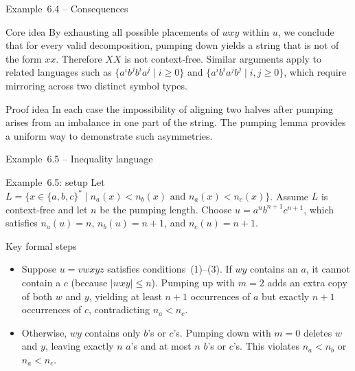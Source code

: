 \begin{frame}[t]{Example 6.4 – Consequences}
  \begin{tblock}{Core idea}
    By exhausting all possible placements of $w x y$ within $u$, we
    conclude that for every valid decomposition, pumping down yields a
    string that is not of the form $xx$.  Therefore $XX$ is not
    context‑free.  Similar arguments apply to related languages such as
    $\{a^i b^j b^i a^j \mid i \ge 0\}$ and $\{a^i b^i a^j b^j \mid i,j \ge 0\}$,
    which require mirroring across two distinct symbol types.
  \end{tblock}
  \begin{tblock}{Proof idea}
    In each case the impossibility of aligning two halves after
    pumping arises from an imbalance in one part of the string.  The
    pumping lemma provides a uniform way to demonstrate such
    asymmetries.
  \end{tblock}
  \label{fr:6.1-18}
\end{frame}

\begin{frame}[t]{Example 6.5 – Inequality language}
  \begin{texample}{Example 6.5: setup}
    Let $L = \{ x \in \{a,b,c\}^* \mid n_a(x) < n_b(x) \text{ and }
    n_a(x) < n_c(x) \}$.  Assume $L$ is context‑free and let $n$ be the
    pumping length.  Choose $u = a^n b^{n+1} c^{n+1}$, which satisfies
    $n_a(u) = n$, $n_b(u) = n+1$, and $n_c(u) = n+1$.
  \end{texample}
  \begin{tblock}{Key formal steps}
    \begin{itemize}
      \item Suppose $u = v w x y z$ satisfies conditions (1)–(3).  If
        $w y$ contains an $a$, it cannot contain a $c$ (because $|w x
        y| \le n$).  Pumping up with $m=2$ adds an extra copy of both
        $w$ and $y$, yielding at least $n+1$ occurrences of $a$ but
        exactly $n+1$ occurrences of $c$, contradicting $n_a < n_c$.
      \item Otherwise, $w y$ contains only $b$’s or $c$’s.  Pumping
        down with $m=0$ deletes $w$ and $y$, leaving exactly $n$
        $a$’s and at most $n$ $b$’s or $c$’s.  This violates $n_a <
        n_b$ or $n_a < n_c$.
    \end{itemize}
  \end{tblock}
  \label{fr:6.1-19}
\end{frame}

